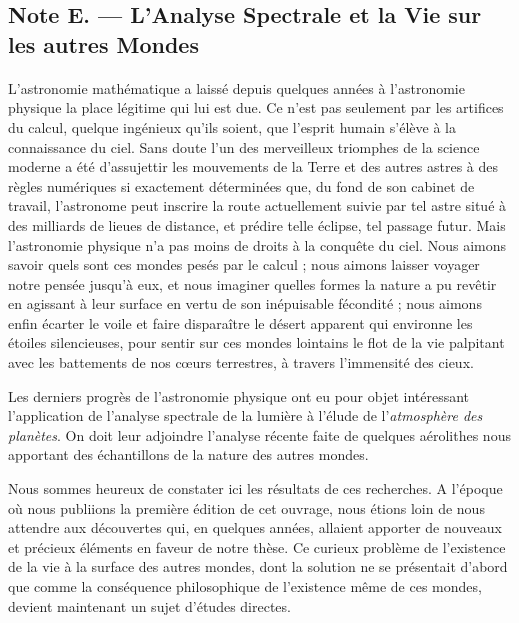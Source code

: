 \documentclass[a4paper, 11pt, oneside, landscape]{article}
\begin{document}
\subsection{Note E. --- L'Analyse Spectrale et la Vie sur les autres Mondes}
\paragraph{}
L'astronomie mathématique a laissé depuis quelques années à l'astronomie physique la place légitime qui lui est due. Ce n'est pas seulement par les artifices du calcul, quelque ingénieux qu'ils soient, que l'esprit humain s'élève à la connaissance du ciel. Sans doute l'un des merveilleux triomphes de la science moderne a été d'assujettir les mouvements de la Terre et des autres astres à des règles numériques si exactement déterminées que, du fond de son cabinet de travail, l'astronome peut inscrire la route actuellement suivie par tel astre situé à des milliards de lieues de distance, et prédire telle éclipse, tel passage futur. Mais l'astronomie physique n'a pas moins de droits à la conquête du ciel. Nous aimons savoir quels sont ces mondes pesés par le calcul ; nous aimons laisser voyager notre pensée jusqu'à eux, et nous imaginer quelles formes la nature a pu revêtir en agissant à leur surface en vertu de son inépuisable fécondité ; nous aimons enfin écarter le voile et faire disparaître le désert apparent qui environne les étoiles silencieuses, pour sentir sur ces mondes lointains le flot de la vie palpitant avec les battements de nos cœurs terrestres, à travers l'immensité des cieux.

Les derniers progrès de l'astronomie physique ont eu pour objet intéressant l'application de l'analyse spectrale de la lumière à l'élude de l'\emph{atmosphère des planètes}. On doit leur adjoindre l'analyse récente faite de quelques aérolithes nous apportant des échantillons de la nature des autres mondes.

Nous sommes heureux de constater ici les résultats de ces recherches. A l'époque où nous publiions la première édition de cet ouvrage, nous étions loin de nous attendre aux découvertes qui, en quelques années, allaient apporter de nouveaux et précieux éléments en faveur de notre thèse. Ce curieux problème de l'existence de la vie à la surface des autres mondes, dont la solution ne se présentait d'abord que comme la conséquence philosophique de l'existence même de ces mondes, devient maintenant un sujet d'études directes.
\end{document}
